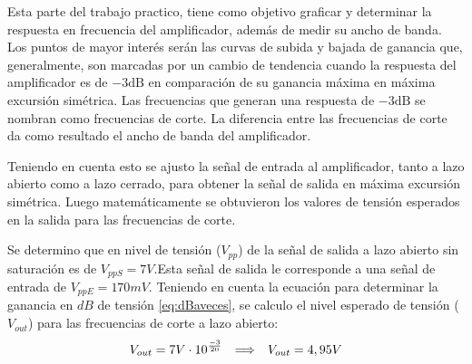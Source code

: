 Esta parte del trabajo practico, tiene como objetivo graficar y determinar la respuesta en frecuencia del amplificador, además de medir su ancho de banda. Los puntos de mayor interés serán las curvas de subida y bajada de ganancia que, generalmente, son marcadas por un cambio de tendencia cuando la respuesta del amplificador es de $-3\mathrm{dB}$ en comparación de su ganancia máxima en máxima excursión simétrica. Las frecuencias que generan una respuesta de $-3\mathrm{dB}$ se nombran como frecuencias de corte. La diferencia entre las frecuencias de corte da como resultado el ancho de banda del amplificador.

Teniendo en cuenta esto se ajusto la señal de entrada al amplificador, tanto a lazo abierto como a lazo cerrado, para obtener la señal de salida en máxima excursión simétrica. Luego matemáticamente se obtuvieron los valores de tensión esperados en la salida para las frecuencias de corte.

Se determino que en nivel de tensión ($V_{pp}$) de la señal de salida a lazo abierto sin saturación es de $V_{ppS}=7V$.Esta señal de salida le corresponde a una señal de entrada de $V_{ppE}=170mV$.
Teniendo en cuenta la ecuación para determinar la ganancia en $dB$ de tensión \ref{eq:dBaveces}, se calculo el nivel esperado de tensión ($V_{out}$) para las frecuencias de corte a lazo abierto:
\begin{equation}
    V_{out}=7V\cdot10^{\frac{-3}{20}}\hspace{0.25cm} \Longrightarrow \hspace{0.25cm} V_{out}=4,95V
\end{equation}

